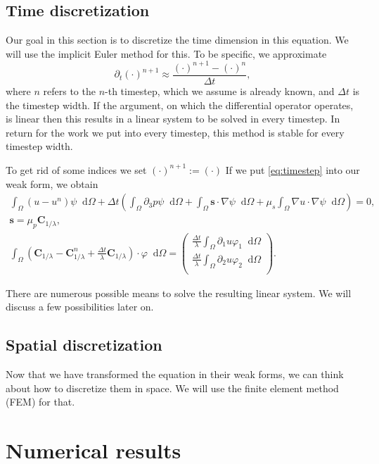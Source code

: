 \documentclass[12pt,a4paper,twoside, open=right]{scrreprt}
\theoremstyle{definition}
\theoremstyle{plain}
\newcommand{\bfs}{\bm{s}}
\newcommand{\bfC}{\bm{C}}
\newcommand{\D}{\mathop{}\!\mathrm{d}}
\begin{document}
\section{Time discretization}
Our goal in this section is to discretize the time dimension in this equation. We will use the implicit Euler method for this. To be specific, we approximate 
\begin{equation}
    \partial_t(\cdot)^{n+1}\approx\frac{(\cdot)^{n+1}-(\cdot)^n}{\Delta t},\label{eq:timestep}
\end{equation}
where $n$ refers to the $n$-th timestep, which we assume is already known, and $\Delta t$ is the timestep width. If the argument, on which the differential operator operates, is linear then this results in a linear system to be solved in every timestep. In return for the work we put into every timestep, this method is stable for every timestep width.
\par 
To get rid of some indices we set $(\cdot)^{n+1}:=(\cdot)$ If we put \eqref{eq:timestep} into our weak form, we obtain 
\begin{align}
  \int_\Omega(u-u^n)\psi\D\Omega +\Delta t\left(\int_\Omega\partial_3 p\psi\D\Omega + \int_\Omega\bfs\cdot\nabla\psi\D\Omega+\mu_s\int_\Omega\nabla u\cdot\nabla\psi\D\Omega\right) = 0,\\
  \bfs =\mu_p\bfC_{1/\lambda},\\
  \int_\Omega(\bfC_{1/\lambda} - \bfC_{1/\lambda}^n +\frac{\Delta t}{\lambda}\bfC_{1/\lambda})\cdot\varphi\D\Omega = 
  \begin{pmatrix}
  \frac{\Delta t}{\lambda}\int_\Omega\partial_1 u\varphi_1\D\Omega\\\frac{\Delta t}{\lambda}\int_\Omega\partial_2 u\varphi_2\D\Omega\\
  \end{pmatrix}.
\end{align}
\par 
There are numerous possible means to solve the resulting linear system. We will discuss a few possibilities later on.
\section{Spatial discretization}
Now that we have transformed the equation in their weak forms, we can think about how to discretize them in space. We will use the finite element method (FEM) for that.
\chapter{Numerical results}
\end{document}
